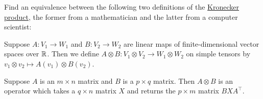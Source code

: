 \begin{problem}
	\gim
	Find an equivalence between the following two definitions of the
	\href{https://en.wikipedia.org/wiki/Kronecker_product}{Kronecker product},
	the former from a mathematician and the latter from a computer scientist:
	\begin{itemize}
		\ii Suppose $A \colon V_1 \to W_1$ and $B \colon V_2 \to W_2$
		are linear maps of finite-dimensional vector spaces over $\mathbb R$.
		Then we define $A \otimes B \colon V_1 \otimes V_2 \to W_1 \otimes W_2$
		on simple tensors by $v_1 \otimes v_2 \mapsto A(v_1) \otimes B(v_2)$.

		\ii Suppose $A$ is an $m \times n$ matrix and $B$ is a $p \times q$ matrix.
		Then $A \otimes B$ is an operator which takes a $q \times n$ matrix $X$
		and returns the $p \times m$ matrix $BXA^\top$.
	\end{itemize}
\end{problem}
